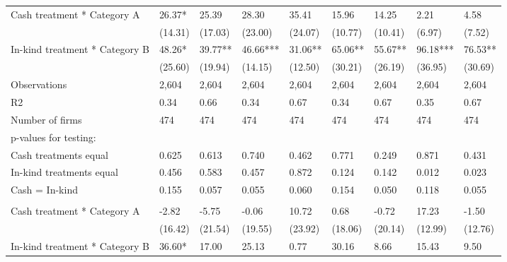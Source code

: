 \documentclass{report}
\begin{document}
\begin{table}[H]
{\begin{tabular}{lllllllll}
\hspace{1em}Cash treatment * Category A & 26.37* & 25.39 & 28.30 & 35.41 & 15.96 & 14.25 & 2.21 & 4.58\\
\hspace{1em} & (14.31) & (17.03) & (23.00) & (24.07) & (10.77) & (10.41) & (6.97) & (7.52)\\
\hspace{1em}In-kind treatment * Category B & 48.26* & 39.77** & 46.66*** & 31.06** & 65.06** & 55.67** & 96.18*** & 76.53**\\
\hspace{1em} & (25.60) & (19.94) & (14.15) & (12.50) & (30.21) & (26.19) & (36.95) & (30.69)\\
\hspace{1em}Observations & 2,604 & 2,604 & 2,604 & 2,604 & 2,604 & 2,604 & 2,604 & 2,604\\
\hspace{1em}R2 & 0.34 & 0.66 & 0.34 & 0.67 & 0.34 & 0.67 & 0.35 & 0.67\\
\hspace{1em}Number of firms & 474 & 474 & 474 & 474 & 474 & 474 & 474 & 474\\
\hspace{1em}p-values for testing: &  &  &  &  &  &  &  \vphantom{1}& \\
\hspace{1em}\hspace{1em} Cash treatments equal & 0.625 & 0.613 & 0.740 & 0.462 & 0.771 & 0.249 & 0.871 & 0.431\\
\hspace{1em}\hspace{1em} In-kind treatments equal & 0.456 & 0.583 & 0.457 & 0.872 & 0.124 & 0.142 & 0.012 & 0.023\\
\hspace{1em}\hspace{1em} Cash = In-kind & 0.155 & 0.057 & 0.055 & 0.060 & 0.154 & 0.050 & 0.118 & 0.055\\
\addlinespace[0.3em]
\multicolumn{9}{l}{\textbf{Panel B: Males}}\\
\hspace{1em}Cash treatment * Category A & -2.82 & -5.75 & -0.06 & 10.72 & 0.68 & -0.72 & 17.23 & -1.50\\
\hspace{1em} & (16.42) & (21.54) & (19.55) & (23.92) & (18.06) & (20.14) & (12.99) & (12.76)\\
\hspace{1em}In-kind treatment * Category B & 36.60* & 17.00 & 25.13 & 0.77 & 30.16 & 8.66 & 15.43 & 9.50\\

\end{tabular}}
\end{table}
\end{document}
